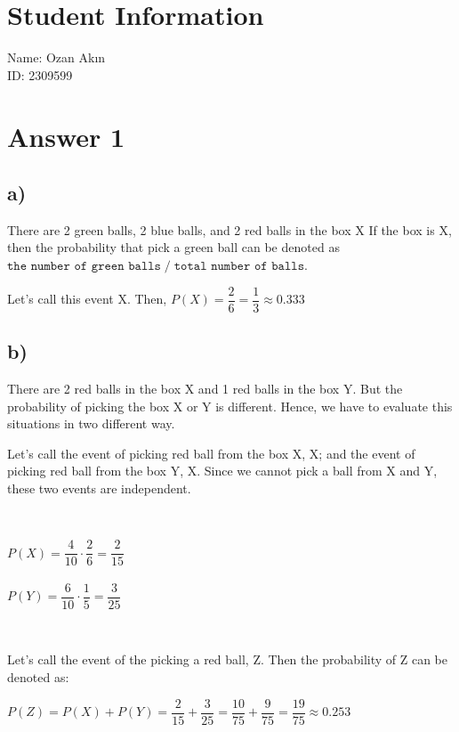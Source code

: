 \documentclass[12pt]{article}
\begin{document}
\section*{Student Information}
\noindent
Name: Ozan Akın \\
ID: 2309599 \\

\section*{Answer 1}
\subsection*{a)}
    There are 2 green balls, 2 blue balls, and 2 red balls in the box X If the box is X, then the probability that pick a green ball can be denoted as $\texttt{the number of green balls} \; / \; \texttt{total number of balls}$. 
    
    Let's call this event X. Then, $P(X) = \dfrac{2}{6} = \dfrac{1}{3} \approx 0.333$
    
\subsection*{b)}
    There are 2 red balls in the box X and 1 red balls in the box Y. But the probability of picking the box X or Y is different. Hence, we have to evaluate this situations in two different way.
    
    Let's call the event of picking red ball from the box X, X; and the event of picking red ball from the box Y, X. Since we cannot pick a ball from X and Y, these two events are independent.
    
    ~
    
    \begin{center}
        $P(X) = \dfrac{4}{10} \cdot \dfrac{2}{6} = \dfrac{2}{15}$ \\
        ~ \\
        $P(Y) =  \dfrac{6}{10} \cdot \dfrac{1}{5} = \dfrac{3}{25}$
    \end{center}{}
    
    ~
    
    Let's call the event of the picking a red ball, Z. Then the probability of Z can be denoted as:
    
    \begin{center}
    $P(Z) = P(X) + P(Y) = \dfrac{2}{15} + \dfrac{3}{25} = \dfrac{10}{75} + \dfrac{9}{75} = \dfrac{19}{75} \approx 0.253$
    \end{center}{}
    
\end{document}

